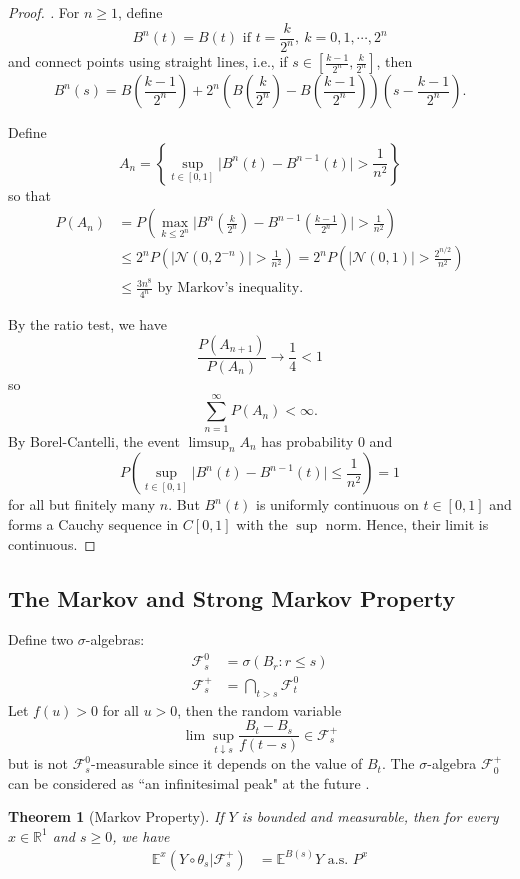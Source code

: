 \documentclass{article}
\theoremstyle{plain}
\newtheorem{theorem}{Theorem}
\theoremstyle{definition}
\begin{document}
\begin{proof}[Proof. \citep{dabrowska2020stochastic}]
For $n\ge 1$, define
$$B^n(t) = B(t)\text{ if }t=\frac{k}{2^n},\ k=0,1,\cdots,2^n$$
and connect points using straight lines, i.e., if $s\in[\frac{k-1}{2^n},\frac{k}{2^n}]$, then
$$B^n(s)=B\left(\frac{k-1}{2^n}\right)+{2^n}\left(B\left(\frac{k}{2^n}\right)-B\left(\frac{k-1}{2^{n}}\right)\right)\left(s-\frac{k-1}{2^n}\right).$$

Define
$$A_n=\left\{ \sup_{t\in[0,1]} \Big| B^n(t)-B^{n-1}(t) \Big| >\frac{1}{n^2}\right\}$$
so that
\begin{align*}
    P\left(A_n\right)&=P\left(\max_{k\le 2^n}\Big| B^n\left(\frac{k}{2^n}\right)-B^{n-1}\left(\frac{k-1}{2^n}\right) \Big| >\frac{1}{n^2}\right)\\
    &\le 2^nP\left(\Big|\mathcal{N}(0,2^{-n})\Big|>\frac{1}{n^2}\right)
    =2^nP\left(\Big|\mathcal{N}(0,1)\Big|>\frac{2^{n/2}}{n^2}\right)\\
    &\le\frac{3n^8}{4^n}\text{ by Markov's inequality.}
\end{align*}

By the ratio test, we have
$$\frac{P(A_{n+1})}{P(A_{n})}\rightarrow\frac{1}{4}<1$$
so 
$$\sum_{n=1}^\infty P(A_n)<\infty.$$
By Borel-Cantelli, the event $\limsup _nA_n$ has probability $0$ and 
$$P\left( \sup_{t\in[0,1]}\Big| B^n(t)-B^{n-1}(t) \Big| \le\frac{1}{n^2}\right)=1$$
for all but finitely many $n$. But $B^n(t)$ is uniformly continuous on $t\in[0,1]$ and forms a Cauchy sequence in $C[0,1]$ with the $\sup$ norm. Hence, their limit is continuous.
\end{proof}

\subsection{The Markov and Strong Markov Property}
Define two $\sigma$-algebras:
\begin{align}
    \mathcal{F}_s^0&=\sigma(B_r:r\le s)\\
    \mathcal{F}_s^+&=\bigcap_{t>s}\mathcal{F}_t^0
\end{align}
Let $f(u)>0$ for all $u>0$, then the random variable
$$\lim\sup_{t\downarrow s}\frac{B_t-B_s}{f(t-s)}\in\mathcal{F}_s^+$$
but is not $\mathcal{F}_s^0$-measurable since it depends on the value of $B_t$. The $\sigma$-algebra $\mathcal{F}_0^+$ can be considered as  ``an infinitesimal peak" at the future \citep{durrett2019probability}.

\begin{theorem}[Markov Property]
If $Y$ is bounded and measurable, then for every $x\in\mathbb{R}^1$ and $s\ge 0$, we have
\begin{align}
    \mathbb{E}^x(Y\circ\theta_s|\mathcal{F}_s^+)&=\mathbb{E}^{B(s)}Y\text{ a.s. }P^x
\end{align}
\end{theorem}
\end{document}

